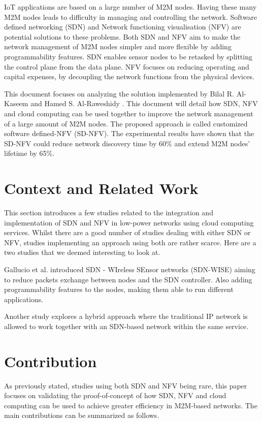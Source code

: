 \documentclass[10pt,journal,compsoc]{IEEEtran}
\begin{document}
IoT applications are based on a large number of M2M nodes. 
Having these many M2M nodes leads to difficulty in 
managing and controlling the network. Software defined networking (SDN) 
and Network functioning visualisation (NFV) are potential solutions to 
these problems. Both SDN and NFV aim to make the network management 
of M2M nodes simpler and more flexible by adding programmability features. 
SDN enables sensor nodes to be retasked by splitting the control plane from 
the data plane. NFV focuses on reducing operating and capital expenses, 
by decoupling the network functions from the physical devices. 

This document focuses on analyzing the solution implemented by Bilal 
R. Al-Kaseem and Hamed S. Al-Raweshidy \cite{main}. 
This document will detail how SDN, NFV and cloud computing can be used 
together to improve the network management of a large amount of M2M nodes. 
The proposed approach is called customized software defined-NFV (SD-NFV). 
The experimental results have shown that the SD-NFV could reduce 
network discovery time by 60\% and extend M2M nodes' lifetime by 65\%.

\section{Context and Related Work}\label{sec:context}

This section introduces a few studies related to the integration and 
implementation of SDN and NFV in low-power networks using cloud 
computing services. Whilst there are a good number of studies dealing with 
either SDN or NFV, studies implementing an approach using both are 
rather scarce. Here are a two studies that we deemed interesting to look 
at. 

Gallucio et al. \cite{sdn-wise} introduced SDN - WIreless SEnsor 
networks (SDN-WISE) aiming to reduce packets exchange between nodes and 
the SDN controller. Also adding programmability features to the nodes, 
making them able to run different applications. 

Another study \cite{hybrid} explores a hybrid approach where the 
traditional IP network is allowed to work together with an SDN-based 
network within the same service. 

\section{Contribution}\label{sec:contribution}

As previously stated, studies using both SDN and NFV being rare, this paper 
focuses on validating the proof-of-concept of how SDN, NFV and cloud 
computing can be used to achieve greater efficiency in M2M-based networks.
The main contributions can be summarized as follows.
\end{document}

